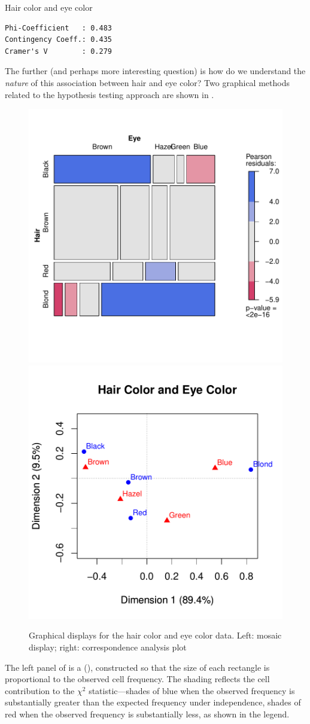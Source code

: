 \documentclass[10pt,krantz2]{krantz}\usepackage[]{graphicx}\usepackage[]{color}
\makeatletter
\newenvironment{kframe}{%
 \def\at@end@of@kframe{}%
 \ifinner\ifhmode%
  \def\at@end@of@kframe{\end{minipage}}%
  \begin{minipage}{\columnwidth}%
 \fi\fi%
 \def\FrameCommand##1{\hskip\@totalleftmargin \hskip-\fboxsep
 \colorbox{shadecolor}{##1}\hskip-\fboxsep
     \hskip-\linewidth \hskip-\@totalleftmargin \hskip\columnwidth}%
 \MakeFramed {\advance\hsize-\width
   \@totalleftmargin\z@ \linewidth\hsize
   \@setminipage}}%
 {\par\unskip\endMakeFramed%
 \at@end@of@kframe}
\newenvironment{knitrout}{}{} %
\renewenvironment{knitrout}{\small\renewcommand{\baselinestretch}{.85}}{} %
\makeatother
\begin{document}
\begin{Example}[haireye0]{Hair color and eye color}
\begin{knitrout}
\begin{kframe}
\begin{verbatim}
Phi-Coefficient   : 0.483 
Contingency Coeff.: 0.435 
Cramer's V        : 0.279 
\end{verbatim}
\end{kframe}
\end{knitrout}
The further (and perhaps more interesting question) is how do we
understand the \emph{nature} of this association between hair
and eye color?
Two graphical methods related to the hypothesis testing approach
are shown in .

\begin{knitrout}
\color{fgcolor}\begin{figure}[!htbp]

\centerline{\includegraphics[width=.49\textwidth]{ch01/fig/haireye02-1} 
\includegraphics[width=.49\textwidth]{ch01/fig/haireye02-2} }

\caption[Graphical displays for the hair color and eye color data]{Graphical displays for the hair color and eye color data. Left: mosaic display; right: correspondence analysis plot\label{fig:haireye02}}
\end{figure}


\end{knitrout}
The left panel of  is a 
(), constructed so that the size of each rectangle
is proportional to the observed cell frequency. The shading
reflects the cell contribution to the \(\chi^2\) statistic---shades of blue
when the observed frequency is substantially greater than the
expected frequency under independence, shades of red when the observed frequency
is substantially less, as shown in the legend.


\end{Example}
\end{document}
